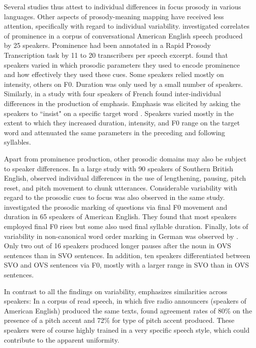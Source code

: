 Several studies thus attest to individual differences in focus prosody in various languages. Other aspects of prosody-meaning mapping have received less attention, specifically with regard to individual variability.
\citet{moProsodyProductionPerception2010} investigated correlates of prominence in a corpus of conversational American English speech produced by 25 speakers. Prominence had been annotated in a Rapid Prosody Transcription task by 11 to 20 transcribers per speech excerpt. \citet{moProsodyProductionPerception2010} found that speakers varied in which prosodic parameters they used to encode prominence and how effectively they used these cues. Some speakers relied mostly on intensity, others on F0. Duration was only used by a small number of speakers. Similarly, \citet{dahanInterspeakerVariabilityEmphatic1996} in a study with four speakers of French found inter-individual differences in the production of emphasis. Emphasis was elicited by asking the speakers to ``insist" on a specific target word \citet[345]{dahanInterspeakerVariabilityEmphatic1996}. Speakers varied mostly in the extent to which they increased duration, intensity, and F0 range on the target word and attenuated the same parameters in the preceding and following syllables.

Apart from prominence production, other prosodic domains may also be subject to speaker differences. In a large study with 90 speakers of Southern British English, \citet{peppeProsodicVariationSouthern2000} observed individual differences in the use of lengthening, pausing, pitch reset, and pitch movement to chunk utterances. Considerable variability with regard to the prosodic cues to focus was also observed in the same study. \citet{xieEncodingDecodingMeaning2021} investigated the prosodic marking of questions via final F0 movement and duration in 65 speakers of American English. They found that most speakers employed final F0 rises but some also used final syllable duration. Finally, lots of variability in non-canonical word order marking in German was observed by \citet{huttenlauchIndividualVariabilityProsodic2022}. Only two out of 16 speakers produced longer pauses after the noun in OVS sentences than in SVO sentences. In addition, ten speakers differentiated between SVO and OVS sentences via F0, mostly with a larger range in SVO than in OVS sentences.

In contrast to all the findings on variability, \citet{yoonSpeakerConsistencyRealization2010} emphasizes similarities across speakers: In a corpus of read speech, in which five radio announcers (speakers of American English) produced the same texts, \citet{yoonSpeakerConsistencyRealization2010} found agreement rates of 80\% on the presence of a pitch accent and 72\% for type of pitch accent produced. These speakers were of course highly trained in a very specific speech style, which could contribute to the apparent uniformity.

